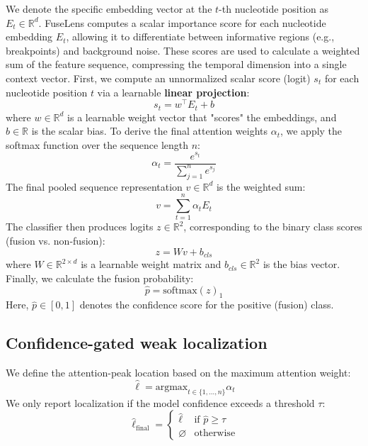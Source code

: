 \documentclass{bioinfo}
\begin{document}
We denote the specific embedding vector at the $t$-th nucleotide position as $E_t \in \mathbb{R}^d$. FuseLens computes a scalar importance score for each nucleotide embedding $E_t$, allowing it to differentiate between informative regions (e.g., breakpoints) and background noise. These scores are used to calculate a weighted sum of the feature sequence, compressing the temporal dimension into a single context vector. 
First, we compute an unnormalized scalar score (logit) $s_t$ for each nucleotide position $t$ via a learnable \textbf{linear projection}:
\begin{equation}
s_t = w^\top E_t + b
\end{equation}
where $w \in \mathbb{R}^d$ is a learnable weight vector that "scores" the embeddings, and $b \in \mathbb{R}$ is the scalar bias.
To derive the final attention weights $\alpha_t$, we apply the softmax function over the sequence length $n$:
\begin{equation}
\alpha_t = \frac{e^{s_t}}{\sum_{j=1}^{n}e^{s_j}}
\end{equation}
The final pooled sequence representation $v \in \mathbb{R}^{d}$ is the weighted sum:
\begin{equation}
v = \sum_{t=1}^{n}\alpha_t E_t
\end{equation}
The classifier then produces logits $z\in\mathbb{R}^2$, corresponding to the binary class scores (fusion vs. non-fusion):
\begin{equation}
z = Wv + b_{cls}
\end{equation}
where $W \in \mathbb{R}^{2 \times d}$ is a learnable weight matrix and $b_{cls} \in \mathbb{R}^2$ is the bias vector.
Finally, we calculate the fusion probability:
\begin{equation}
\hat{p} = \mathrm{softmax}(z)_1
\end{equation}
Here, $\hat{p} \in [0,1]$ denotes the confidence score for the positive (fusion) class.

\subsection{Confidence-gated weak localization}
\label{sec:localization}
We define the attention-peak location based on the maximum attention weight:
\begin{equation}
\hat{\ell} = \mathrm{argmax}_{t\in\{1,\dots,n\}}\alpha_t
\end{equation}
We only report localization if the model confidence exceeds a threshold $\tau$:
\begin{equation}
\hat{\ell}_{\text{final}} =
\begin{cases}
\hat{\ell} & \text{if } \hat{p}\ge\tau\\
\varnothing & \text{otherwise}
\end{cases}
\end{equation}
\end{document}
